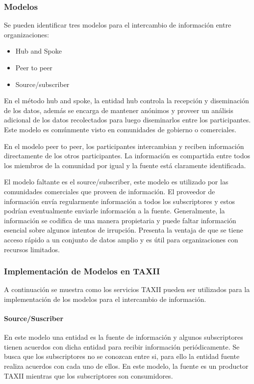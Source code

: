 \subsubsection{Modelos}

Se pueden identificar tres modelos para el intercambio de información entre 
organizaciones:
\begin{itemize}
  \item Hub and Spoke
  \item Peer to peer
  \item Source/subscriber
\end{itemize}

En el método hub and spoke, la entidad hub controla la recepción y diseminación 
de los datos, además se encarga de mantener anónimos y proveer un análisis 
adicional de los datos recolectados para luego diseminarlos entre los 
participantes. Este modelo es comúnmente visto en comunidades de gobierno o comerciales.

En el modelo peer to peer, los participantes intercambian y reciben información 
directamente de los otros participantes. La información es compartida entre 
todos los miembros de la comunidad por igual y la fuente está claramente 
identificada.

El modelo faltante es el source/subscriber, este modelo es utilizado por las 
comunidades comerciales que proveen de información. El proveedor de información 
envía regularmente información a todos los subscriptores y estos podrían 
eventualmente enviarle información a la fuente. Generalmente, la información se 
codifica de una manera propietaria y puede faltar información esencial sobre 
algunos intentos de irrupción. Presenta la ventaja de que se tiene acceso rápido 
a un conjunto de datos amplio y es útil para organizaciones con recursos 
limitados.

\subsubsection{Implementación de Modelos en TAXII}

A continuación se muestra como los servicios TAXII pueden ser utilizados para la 
implementación de los modelos para el intercambio de información.

\paragraph{Source/Suscriber}

En este modelo una entidad es la fuente de información y algunos subscriptores 
tienen acuerdos con dicha entidad para recibir información periódicamente. Se 
busca que los subscriptores no se conozcan entre si, para ello la entidad fuente 
realiza acuerdos con cada uno de ellos. En este modelo, la fuente es 
un productor TAXII mientras que los subscriptores son consumidores.

